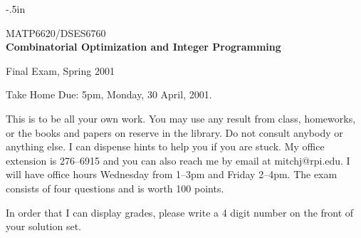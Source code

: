 

\oddsidemargin -.5in
\textwidth 7in
\textheight 9.5in
\topmargin -30pt
\headsep 0in
\headheight 0in

\newcommand{\til}{\char '176}



\begin{center}
  \begin{large}
     MATP6620/DSES6760 \\
 {\bf Combinatorial Optimization and Integer Programming}
  \end{large}
\end{center}
\begin{center}
  \begin{large}
                Final Exam, Spring 2001
  \end{large}
\end{center}

Take Home   \hfill    Due: 5pm, Monday, 30 April, 2001.

\vspace{\baselineskip}

This is to be all your own work.  You may use any result from class,
homeworks, or the books and papers on reserve in the library.
Do not consult anybody or anything else. 
I can dispense hints to help you if you are stuck.
My office extension is 276--6915 and
you can also reach me by email at mitchj@rpi.edu.
I will have office hours Wednesday from 1--3pm
and Friday 2--4pm.
The exam consists of four questions and is worth 100 points.

In order that I can display grades, please write a 4 digit number
on the front of your solution set.

\vspace{\baselineskip}

